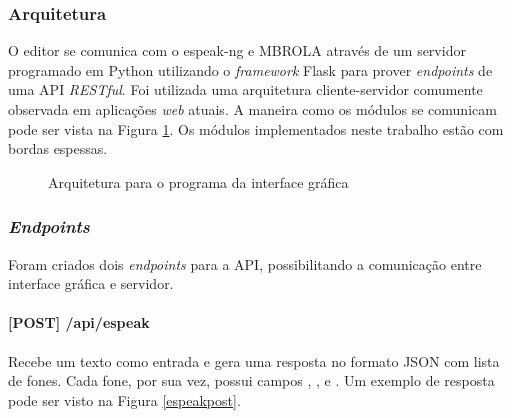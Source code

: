 \subsubsection{Arquitetura}
 O editor se comunica com o espeak-ng e MBROLA através de um
servidor programado em Python utilizando o \emph{framework} Flask para prover
\emph{endpoints} de uma API \emph{RESTful}. Foi utilizada uma arquitetura
cliente-servidor \cite{rest} comumente observada em aplicações \emph{web}
atuais. A maneira como os módulos se comunicam pode ser vista na Figura
\ref{fig:arch}. Os módulos implementados neste trabalho estão com bordas
espessas.

\begin{figure}[!htbp]
\centering
{}
\caption{Arquitetura para o programa da interface gráfica \label{fig:arch}}
\end{figure}

\subsubsection{\emph{Endpoints}}
Foram criados dois \emph{endpoints} para a API, possibilitando a comunicação entre
interface gráfica e servidor.

\paragraph{[POST] /api/espeak} Recebe um texto como entrada e gera uma resposta
no formato JSON com lista de fones. Cada fone, por sua vez, possui campos ,
,  e . Um exemplo de resposta pode ser visto na Figura \ref{espeakpost}.
